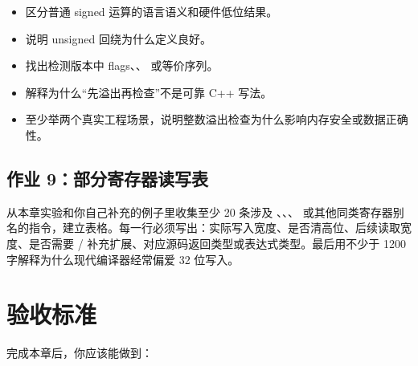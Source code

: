 \begin{exercisebox}
\begin{itemize}
  \item 区分普通 signed 运算的语言语义和硬件低位结果。
  \item 说明 unsigned 回绕为什么定义良好。
  \item 找出检测版本中 flags、、 或等价序列。
  \item 解释为什么“先溢出再检查”不是可靠 C++ 写法。
  \item 至少举两个真实工程场景，说明整数溢出检查为什么影响内存安全或数据正确性。
\end{itemize}

\subsection*{作业 9：部分寄存器读写表}

从本章实验和你自己补充的例子里收集至少 20 条涉及 、、、 或其他同类寄存器别名的指令，建立表格。每一行必须写出：实际写入宽度、是否清高位、后续读取宽度、是否需要 / 补充扩展、对应源码返回类型或表达式类型。最后用不少于 1200 字解释为什么现代编译器经常偏爱 32 位写入。
\end{exercisebox}

\section{验收标准}

完成本章后，你应该能做到：

